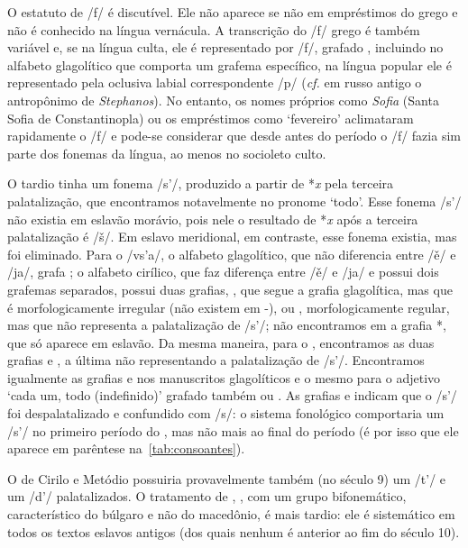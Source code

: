 O estatuto de /f/ é discutível.
Ele não aparece se não em empréstimos do grego e não é conhecido na língua
vernácula.
A transcrição do /f/ grego é também variável e, se na língua culta, ele é
representado por /f/, grafado , incluindo no alfabeto
glagolítico que comporta um grafema específico, na língua popular ele é
representado pela oclusiva labial correspondente /p/ (\emph{cf.} em russo antigo
o antropônimo  de \emph{Stephanos}).
No entanto, os nomes próprios como \emph{Sofia} (Santa Sofia de Constantinopla)
ou os empréstimos como  `fevereiro'
aclimataram rapidamente o /f/ e pode-se considerar que desde antes do período
 o /f/ fazia sim parte dos fonemas da língua, ao menos no socioleto
culto.

O  tardio tinha um fonema /s'/, produzido a partir de *\emph{x} pela
terceira palatalização, que encontramos notavelmente no pronome
 `todo'.
Esse fonema /s'/ não existia em eslavão morávio, pois nele o resultado de *\emph{x}
após a terceira palatalização é /š/.
Em eslavo meridional, em contraste, esse fonema existia, mas foi eliminado.
Para o  /v\jeri{}s'a/, o alfabeto glagolítico, que não
diferencia entre /ě/ e /ja/, grafa ; o alfabeto cirílico, que faz
diferença entre /ě/ e /ja/ e possui dois grafemas separados, possui duas
grafias, , que segue a grafia glagolítica, mas que é
morfologicamente irregular (não existem  em -), ou
, morfologicamente regular, mas que não representa a
palatalização de /s'/; não encontramos em  a grafia
*, que só aparece em eslavão.
Da mesma maneira, para o , encontramos as duas grafias
 e , a última não
representando a palatalização de /s'/.
Encontramos igualmente as grafias  e  nos manuscritos
glagolíticos e o mesmo para o adjetivo  `cada um, todo
(indefinido)' grafado também  ou .
As grafias  e  indicam que o /s'/ foi despalatalizado e
confundido com /s/: o sistema fonológico comportaria um /s'/ no primeiro período
do , mas não mais ao final do período  (é por isso que
ele aparece em parêntese na~\autoref{tab:consoantes}).

O  de Cirilo e Metódio possuiria provavelmente também (no século
9) um /t'/ e um /d'/ palatalizados.
O tratamento de , , com um grupo bifonemático,
característico do búlgaro e não do macedônio, é mais tardio: ele é sistemático
em todos os textos eslavos antigos (dos quais nenhum é anterior ao fim do século
10).


